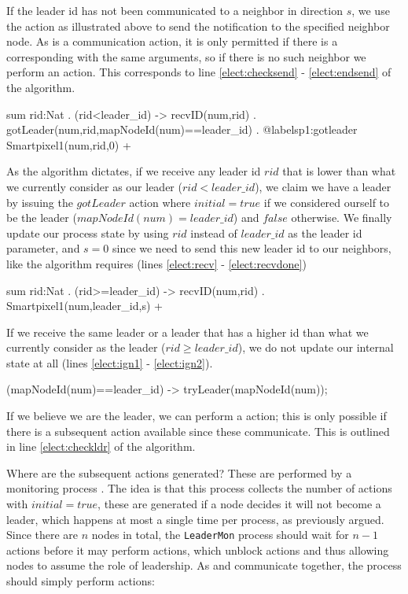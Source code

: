 If the leader id has not been communicated to a neighbor in direction $s$, we use the  action as illustrated above to send the notification to the specified neighbor node. As  is a communication action, it is only permitted if there is a corresponding  with the same arguments, so if there is no such neighbor we perform an  action. This corresponds to line \ref{elect:checksend} - \ref{elect:endsend} of the algorithm.

\begin{codeverb}
sum rid:Nat . (rid<leader_id) -> recvID(num,rid) .
                                  gotLeader(num,rid,mapNodeId(num)==leader_id) . @label{sp1:gotleader}
	                          Smartpixel1(num,rid,0) +
\end{codeverb}

As the algorithm dictates, if we receive any leader id $rid$ that is lower than what we currently consider as our leader ($rid < leader\_id$), we claim we have a leader by issuing the $gotLeader$ action where $initial = true$ if we considered ourself to be the leader ($mapNodeId(num) = leader\_id$) and $false$ otherwise. We finally update our process state by using $rid$ instead of $leader\_id$ as the leader id parameter, and $s = 0$ since we need to send this new leader id to our neighbors, like the algorithm requires (lines \ref{elect:recv} - \ref{elect:recvdone})

\begin{codeverb}
sum rid:Nat . (rid>=leader_id) -> recvID(num,rid) .
                                   Smartpixel1(num,leader_id,s) +
\end{codeverb}

If we receive the same leader or a leader that has a higher id than what we currently consider as the leader ($rid \geq leader\_id$), we do not update our internal state at all (lines \ref{elect:ign1} - \ref{elect:ign2}).

\begin{codeverb}
(mapNodeId(num)==leader_id) -> tryLeader(mapNodeId(num));
\end{codeverb}

If we believe we are the leader, we can perform a  action; this is only possible if there is a subsequent  action available since these communicate. This is outlined in line \ref{elect:checkldr} of the algorithm.

Where are the subsequent  actions generated? These are performed by a monitoring process . The idea is that this process collects the number of  actions with $initial = true$, these are generated if a node decides it will not become a leader, which happens at most a single time per process, as previously argued. Since there are $n$ nodes in total, the \texttt{LeaderMon} process should wait for $n - 1$  actions before it may perform  actions, which unblock  actions and thus allowing nodes to assume the role of leadership. As  and  communicate together, the  process should simply perform  actions:

